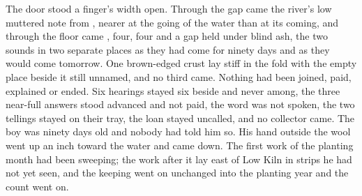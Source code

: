 The door stood a finger's width open. Through the gap came the river's low muttered note from , nearer at the going of the water than at its coming, and through the floor came , four, four and a gap held under blind ash, the two sounds in two separate places as they had come for ninety days and as they would come tomorrow. One brown-edged crust lay stiff in the fold with the empty place beside it still unnamed, and no third came. Nothing had been joined, paid, explained or ended. Six hearings stayed six beside and never among, the three near-full answers stood advanced and not paid, the word was not spoken, the two tellings stayed on their tray, the loan stayed uncalled, and no collector came. The boy was ninety days old and nobody had told him so. His hand outside the wool went up an inch toward the water and came down. The first work of the planting month had been sweeping; the work after it lay east of Low Kiln in strips he had not yet seen, and the keeping went on unchanged into the planting year and the count went on.
